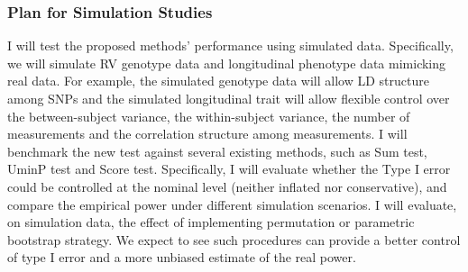 \documentclass[12pt]{article}
\begin{document}
%
%
\subsubsection{Plan for Simulation Studies}\label{sec:aim1b-PSS}
I will test the proposed methods' performance using simulated data. Specifically, we will simulate RV genotype data and longitudinal phenotype data mimicking real data. For example, the simulated genotype data will allow LD structure among SNPs and the simulated longitudinal trait will allow flexible control over the between-subject variance, the within-subject variance, the number of measurements and the correlation structure among measurements. I will benchmark the new test against several existing methods, such as Sum test, UminP test and Score test. Specifically, I will evaluate whether the Type I error could be controlled at the nominal level (neither inflated nor conservative), and compare the empirical power under different simulation scenarios.
I will evaluate, on simulation data, the effect of implementing permutation or parametric bootstrap strategy. We expect to see such procedures can provide a better control of type I error and a more unbiased estimate of the real power.
\end{document}
